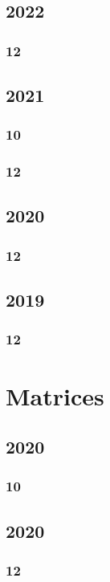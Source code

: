 \documentclass[11pt]{book}
\begin{document}
\section{2022}
\subsection{12}

\section{2021}
\subsection{10}

\subsection{12}

\section{2020} 
\subsection{12} 

\section{2019} 
\subsection{12}




\chapter{Matrices}
\section{2020}
\subsection{10}

\section{2020}
\subsection{12}

\end{document}

